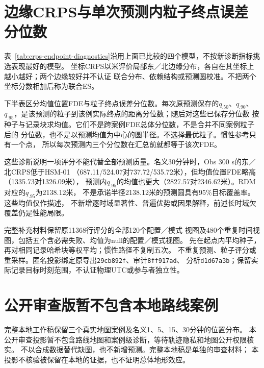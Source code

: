 



\section{边缘CRPS与单次预测内粒子终点误差分位数}
\label{sec:secondary-score-diagnostics}\hypertarget{sec:secondary-score-diagnostics}{}
表~\ref{tab:crps-endpoint-diagnostics}沿用上面已比较的四个模型，不按新诊断指标挑选表现最好的模型。
坐标CRPS以米评价局部东／北边缘分布，各自在其坐标上越小越好；两个边缘较好并不认证
联合分布、依赖结构或预测圆校准。不把两个坐标分数相加后称为联合ES。

下半表区分均值位置FDE与粒子终点误差分位数。每次原预测保存的$q_{.50}$、$q_{.90}$、
$q_{.95}$，是该预测的粒子到该例实际终点的距离分位数；随后对这些已保存分位数
按种子与记录块求均值。它们不是跨案例FDE总体分位数，不是合并不同案例粒子后的
分位数，也不是以预测均值为中心的圆半径。不选择最优粒子。惯性参考只有一个点，
所以每次预测内三个分位数在汇总前就都等于该次FDE。

这些诊断说明一项评分不能代替全部预测质量。名义30分钟时，Obs 300 s的东／北CRPS低于HSM-01
（687.11/524.07对737.72/535.72米），但均值位置FDE略高（1335.73对1326.09米），
预测内$q_{.95}$的均值也更大（2827.57对2346.62米）。RDM对应的$q_{.95}$为2138.12米，
不是承诺半径2138.12米的预测圆具有95\%目标覆盖率。这些均值仅作描述，
不新增逐时域显著性、普遍优势或因果解释，前述长时域欠覆盖仍是性能局限。

完整补充材料保留原11368行评分的全部120个配置／模式
视图及480个重复时间视图，包括五个含必需失败、均值为null的配置／模式视图。
先在起点内平均种子，再对相同记录哈希块等权平均；惯性路径不复制五次。
不重复预测、粒子评分或重采样。匿名投影绑定原导出\texttt{29cb892f}、审计\texttt{8ff917ad}、
分析\texttt{d1d67a3b}；保留实际记录目标时刻范围，不认证物理UTC或参与者独立性。



\section{公开审查版暂不包含本地路线案例}
\label{sec:case-horizons}\hypertarget{sec:case-horizons}{}
完整本地工作稿保留三个真实地图案例及名义1、5、15、30分钟的位置分布。
本公开审查投影暂不包含路线地图和案例级诊断，等待轨迹隐私和地图公开权限核实。
不以合成数据替代缺图，也不新增预测。完整本地稿是单独的审查材料；
本投影不核验被保留在本地的证据，也不证明总体地形效应。

